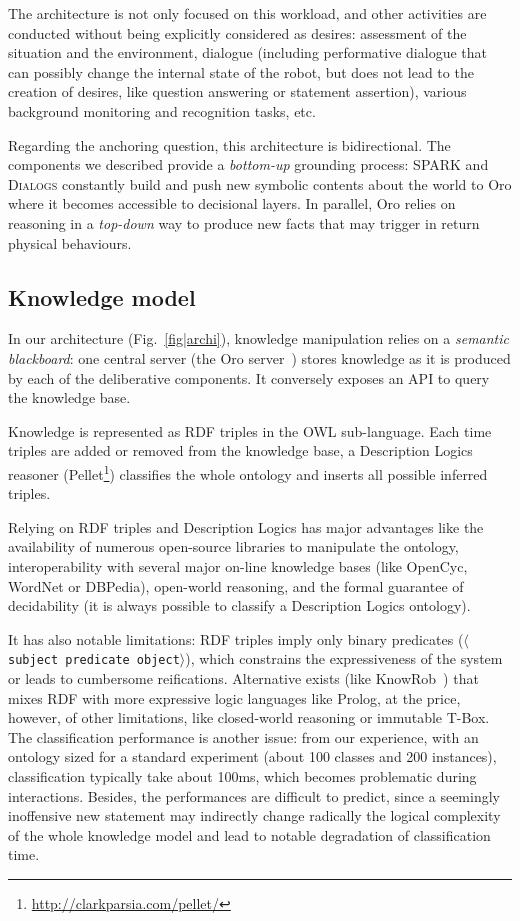 \documentclass[letterpaper, 10 pt, conference]{ieeeconf}  %
\newcommand{\stmt}[1]{{\footnotesize \tt $\langle$ #1\relax$\rangle$}}
\begin{document}
The architecture is not only focused on this workload, and other
activities are conducted without being explicitly considered as desires:
assessment of the situation and the environment, dialogue (including
performative dialogue that can possibly change the internal state of the robot,
but does not lead to the creation of desires,  like question answering or
statement assertion), various background monitoring and recognition tasks, etc.

Regarding the anchoring question, this architecture is bidirectional. The
components we described provide a \textit{bottom-up} grounding process: SPARK
and \textsc{Dialogs} constantly build and push new symbolic contents about the
world to {\sc Oro} where it becomes accessible to decisional layers. In parallel, {\sc Oro}
relies on reasoning in a \textit{top-down} way to produce new facts that may
trigger in return physical behaviours. 

\subsection{Knowledge model}

In our architecture (Fig.~\ref{fig|archi}), knowledge manipulation relies on a
\emph{semantic blackboard}: one central server (the {\sc Oro}
server~\cite{Lemaignan2010}) stores knowledge as it is produced by each of the
deliberative components. It conversely exposes an API to query the knowledge
base.

Knowledge is represented as RDF triples in the OWL sub-language. Each
time triples are added or removed from the knowledge base, a Description
Logics reasoner ({\sc Pellet}\footnote{\url{http://clarkparsia.com/pellet/}})
classifies the whole ontology and inserts all possible inferred triples.

Relying on RDF triples and Description Logics has major advantages like the
availability of numerous open-source libraries to manipulate the ontology,
interoperability with several major on-line knowledge bases (like {\sc
OpenCyc}, {\sc WordNet} or {\sc DBPedia}), open-world reasoning, and the formal
guarantee of decidability (it is always possible to classify a Description
Logics ontology).

It has also notable limitations: RDF triples imply only binary predicates
(\stmt{subject predicate object}), which constrains the expressiveness of the
system or leads to cumbersome reifications. Alternative exists (like {\sc
KnowRob}~\cite{Tenorth2009a}) that mixes RDF with more expressive logic
languages like {\sc Prolog}, at the price, however, of other limitations, like
closed-world reasoning or immutable T-Box. The classification
performance is another issue: from our experience, with an ontology sized for a
standard experiment (about 100 classes and 200 instances), classification
typically take about 100ms, which becomes problematic during interactions.
Besides, the performances are difficult to predict, since a seemingly
inoffensive new statement may indirectly change radically the logical
complexity of the whole knowledge model and lead to notable degradation of
classification time.
\end{document}
